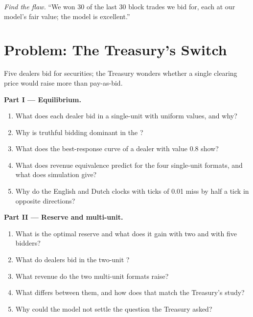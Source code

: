 \begin{exercise}[$\star\star\star$]\label{exo:qm:games-auctions-and-information:8}
\emph{Find the flaw.} ``We won 30 of the last 30 block trades we bid for, each at our model's fair value; the model is excellent.''
\end{exercise}

\section{Problem: The Treasury's Switch}

\begin{problem}\label{pb:qm:games-auctions-and-information:1}
Five dealers bid for securities; the Treasury wonders whether a single clearing price would raise more than pay-as-bid.

\medskip\noindent\textbf{Part I --- Equilibrium.}
\begin{enumerate}
\item What does each dealer bid in a single-unit  with uniform values, and why?
\item Why is truthful bidding dominant in the ?
\item What does the best-response curve of a dealer with value 0.8 show?
\item What does revenue equivalence predict for the four single-unit formats, and what does simulation give?
\item Why do the English and Dutch clocks with ticks of 0.01 miss by half a tick in opposite directions?
\end{enumerate}

\medskip\noindent\textbf{Part II --- Reserve and multi-unit.}
\begin{enumerate}[resume]
\item What is the optimal reserve and what does it gain with two and with five bidders?
\item What do dealers bid in the two-unit ?
\item What revenue do the two multi-unit formats raise?
\item What differs between them, and how does that match the Treasury's study?
\item Why could the model not settle the question the Treasury asked?
\end{enumerate}


\end{problem}
